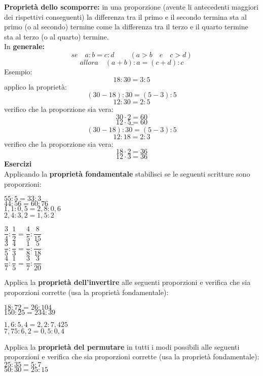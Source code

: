 \documentclass[14pt]{extarticle}
\begin{document}
\textbf{Proprietà dello scomporre:} in una proporzione (avente li antecedenti maggiori dei rispettivi conseguenti) la differenza tra il primo e il secondo termina sta al primo (o al secondo) termine come la differenza tra il terzo e il quarto termine sta al terzo (o al quarto) termine. \\
In \textbf{generale:}    
\[se\quad a:b=c:d\ \qquad(a>b \quad e \quad c>d)\]
\[allora\quad (a+b):a=(c+d):c\]
Esempio:
\[18:30=3:5\]
applico la proprietà:
\[(30-18):30=(5-3):5\]
\[12:30=2:5\]
verifico che la proporzione sia vera:
\[30\cdot2=60\]
\[12\cdot5=60\]
\[-\]
\[(30-18):30=(5-3):5\]
\[12:18=2:3\]
verifico che la proporzione sia vera:
\[18\cdot2=36\]
\[12\cdot3=36\]
\clearpage
\textbf{Esercizi}\\
Applicando la \textbf{proprietà fondamentale} stabilisci se le seguenti scritture sono proporzioni:\\
\begin{spacing}{2.1}
\begin{minipage}[t]{0.5\textwidth}
\(55:5=33:3\)\\
\(44:56=60:76\)\\
\(1,1:0,5=2,8:0,6\)\\
\(2,4:3,2=1,5:2\)\\
\end{minipage}
\begin{minipage}[t]{0.5\textwidth}
\(\dfrac{3}{4}:\dfrac{1}{2}=\dfrac{4}{5}:\dfrac{8}{15}\)\\
\(\dfrac{3}{5}:\dfrac{4}{3}=\dfrac{1}{8}:\dfrac{5}{18}\)\\
\(\dfrac{4}{7}:\dfrac{1}{5}=\dfrac{3}{7}:\dfrac{3}{20}\)\\
\end{minipage}
\end{spacing}
Applica la \textbf{proprietà dell'invertire} alle seguenti proporzioni e verifica che sia proporzioni corrette (usa la proprietà fondamentale):\\
\begin{minipage}[t]{0.5\textwidth}
\(18:72=26:104\)\\
\(150:25=234:39\)\\
\end{minipage}
\begin{minipage}[t]{0.5\textwidth}
\(1,6:5,4=2,2:7,425\)\\
\(7,75:6,2=0,5:0,4\)\\
\end{minipage}
Applica la \textbf{proprietà del permutare} in tutti i modi possibili alle seguenti proporzioni e verifica che sia proporzioni corrette (usa la proprietà fondamentale):\\
\(25:35=5:7\)\\
\(50:30=25:15\)\\
\end{document}
